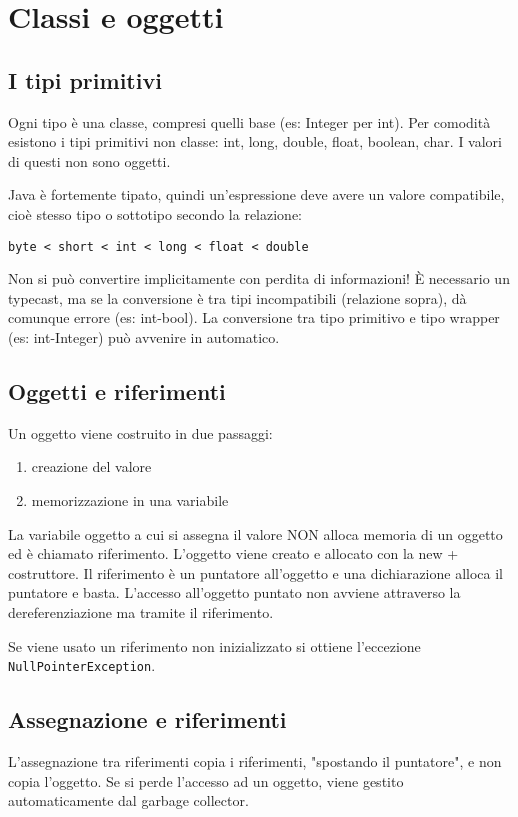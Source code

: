 \chapter{Classi e oggetti}

\section{I tipi primitivi}
Ogni tipo è una classe, compresi quelli base (es: Integer per int). 
Per comodità esistono i tipi primitivi non classe: int, long, double, float, boolean, char. I valori di questi non sono oggetti.

Java è fortemente tipato, quindi un'espressione deve avere un valore compatibile, cioè stesso tipo o sottotipo secondo la relazione:
\begin{verbatim}
byte < short < int < long < float < double 
\end{verbatim} 
Non si può convertire implicitamente con perdita di informazioni! È necessario un typecast, ma se la conversione è tra tipi incompatibili (relazione sopra), dà comunque errore (es: int-bool). La conversione tra tipo primitivo e tipo wrapper (es: int-Integer) può avvenire in automatico.

\section{Oggetti e riferimenti}
Un oggetto viene costruito in due passaggi:
\begin{enumerate}
\item creazione del valore
\item memorizzazione in una variabile
\end{enumerate}
La variabile oggetto a cui si assegna il valore NON alloca memoria di un oggetto ed è chiamato riferimento.
L'oggetto viene creato e allocato con la new + costruttore.
Il riferimento è un puntatore all'oggetto e una dichiarazione alloca il puntatore e basta. L'accesso all'oggetto puntato non avviene attraverso la dereferenziazione ma tramite il riferimento.

Se viene usato un riferimento non inizializzato si ottiene l'eccezione \texttt{NullPointerException}.

\section{Assegnazione e riferimenti}
L'assegnazione tra riferimenti copia i riferimenti, "spostando il puntatore", e non copia l'oggetto. Se si perde l'accesso ad un oggetto, viene gestito automaticamente dal garbage collector.

